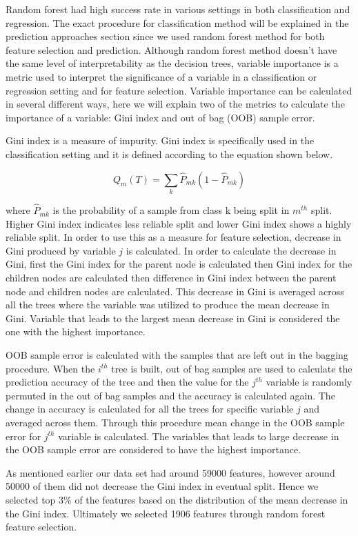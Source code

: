 \documentclass[a4paper]{article}
\begin{document}
Random forest had high success rate in various settings in both classification and regression. The exact procedure for classification method will be explained in the prediction approaches section since we used random forest method for both feature selection and prediction. Although random forest method doesn't have the same level of interpretability as the decision trees, variable importance is a metric used to interpret the significance of a variable in a classification or regression setting and for feature selection. Variable importance can be calculated in several different ways, here we will explain two of the metrics to calculate the importance of a variable: Gini index and out of bag (OOB) sample error. 

Gini index is a measure of impurity. Gini index is specifically used in the classification setting and it is defined according to the equation shown below.

$$Q_m(T) = \sum_{k} \hat{P}_{mk}(1-\hat{P}_{mk})$$ 

where $ \hat{P}_{mk}$ is the probability of a sample from class k being split in $m^{th}$ split. Higher Gini index indicates less reliable split and lower Gini index shows a highly reliable split. In order to use this as a measure for feature selection, decrease in Gini produced by variable $j$ is calculated. In order to calculate the decrease in Gini, first the Gini index for the parent node is calculated then Gini index for the children nodes are calculated then difference in Gini index between the parent node and children nodes are calculated. This decrease in Gini is averaged across all the trees where the variable was utilized to produce the mean decrease in Gini. Variable that leads to the largest mean decrease in Gini is considered the one with the highest importance.

OOB sample error is calculated with the samples that are left out in the bagging procedure. When the $i^{th}$ tree is built, out of bag samples 
are used to calculate the prediction accuracy of the tree and then the value for the $j^{th}$ variable is randomly permuted in the out of bag samples and the accuracy is calculated again. The change in accuracy is calculated for all the trees for specific variable $j$ and averaged across them. Through this procedure mean change in the OOB sample error for $j^{th}$ variable is calculated. The variables that leads to large decrease in the OOB sample error are considered to have the highest importance. 

As mentioned earlier our data set had around 59000 features, however around 50000 of them did not decrease the Gini index in eventual split. Hence we selected top $3\%$ of the features based on the distribution of the mean decrease in the Gini index. Ultimately we selected 1906 features through random forest feature selection.
\end{document}
